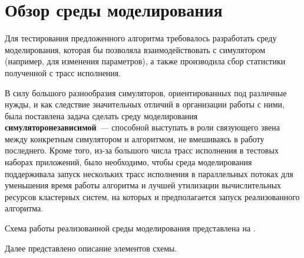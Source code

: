 \section{Обзор среды моделирования}

Для тестирования предложенного алгоритма требовалось разработать среду моделирования, которая бы позволяла взаимодействовать с симулятором (например, для изменения параметров), а также производила сбор статистики полученной с трасс исполнения.

В силу большого разнообразия симуляторов, ориентированных под различные нужды, и как следствие значительных отличий в организации работы с ними, была поставлена задача сделать среду моделирования \textbf{симуляторонезависимой}~--- способной выступать в роли связующего звена между конкретным симулятором и алгоритмом, не вмешиваясь в работу последнего. Кроме того, из-за большого числа трасс исполнения в тестовых наборах приложений, было необходимо, чтобы среда моделирования поддерживала запуск нескольких трасс исполнения в параллельных потоках для уменьшения время работы алгоритма и лучшей утилизации вычислительных ресурсов кластерных систем, на которых и предполагается запуск реализованного алгоритма.

Схема работы реализованной среды моделирования представлена на .

Далее представлено описание элементов схемы.

